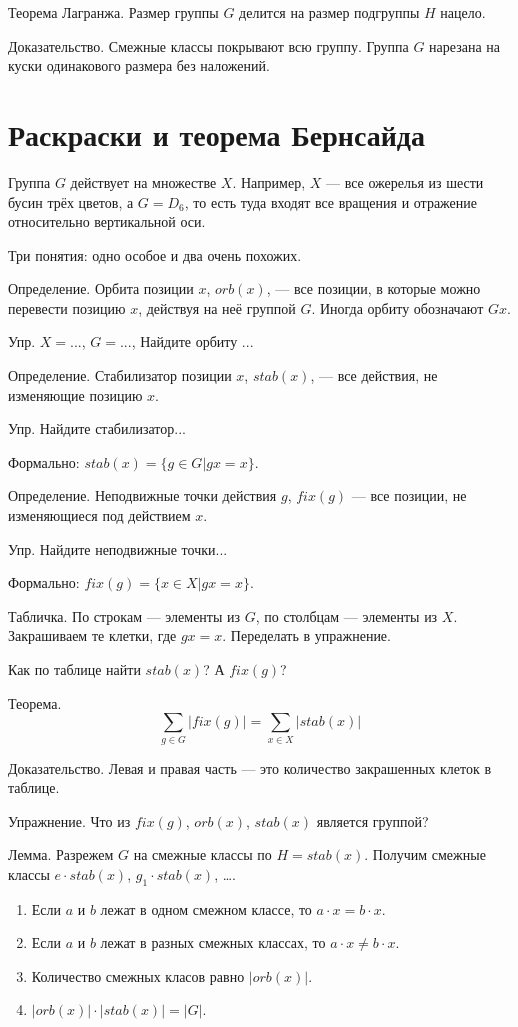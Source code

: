 \documentclass[12pt]{article} %
\begin{document}
Теорема Лагранжа.  Размер группы $G$ делится на размер подгруппы $H$ нацело.

Доказательство. Смежные классы покрывают всю группу. Группа $G$ нарезана на куски одинакового размера без наложений.



\section{Раскраски и теорема Бернсайда}

Группа $G$ действует на множестве $X$. Например, $X$ — все ожерелья из шести бусин трёх цветов, а $G=D_6$, то есть туда входят все вращения и отражение относительно вертикальной оси.

Три понятия: одно особое и два очень похожих.

Определение. Орбита позиции $x$, $orb(x)$, — все позиции, в которые можно перевести позицию $x$, действуя на неё группой $G$. Иногда орбиту обозначают $Gx$.


Упр. $X=...$, $G=...$, Найдите орбиту ...

Определение. Стабилизатор позиции $x$, $stab(x)$, — все действия, не изменяющие позицию $x$.

Упр. Найдите стабилизатор...

Формально: $stab(x) = \{g \in G | gx=x \}$.

Определение. Неподвижные точки действия $g$, $fix(g)$ — все позиции, не изменяющиеся под действием $x$.

Упр. Найдите неподвижные точки...

Формально: $fix(g) = \{x \in X | gx = x\}$.


Табличка. По строкам — элементы из $G$, по столбцам — элементы из $X$. Закрашиваем те клетки, где $gx = x$. Переделать в упражнение.


Как по таблице найти $stab(x)$? А $fix(g)$?

Теорема.
\[
\sum_{g\in G} |fix(g)| = \sum_{x\in X} |stab(x)|
\]

Доказательство. Левая и правая часть — это количество закрашенных клеток в таблице.

Упражнение. Что из $fix(g)$, $orb(x)$, $stab(x)$ является группой?

Лемма. Разрежем $G$ на смежные классы по $H=stab(x)$. Получим смежные классы $e\cdot stab(x)$, $g_1\cdot stab(x)$, \ldots.
\begin{enumerate}
\item Если $a$ и $b$ лежат в одном смежном классе, то $a\cdot x = b\cdot x$.
\item Если $a$ и $b$ лежат в разных смежных классах, то $a\cdot x \neq b \cdot x$.
\item Количество смежных класов равно $|orb(x)|$.
\item $|orb(x)| \cdot |stab(x)| = |G|$.
\end{enumerate}
\end{document}
